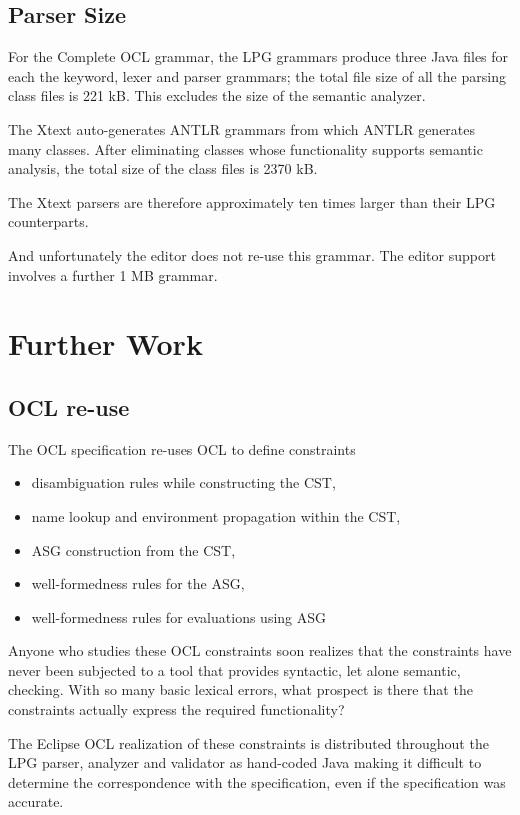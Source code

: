 \documentclass{eceasst}
\begin{document}
\subsection{Parser Size}

For the Complete OCL grammar, the LPG grammars produce three Java files for each the keyword, lexer and parser grammars; the total file size of all the parsing class files is 221 kB. This excludes the size of the semantic analyzer.

The Xtext auto-generates ANTLR grammars from which ANTLR generates many classes. After eliminating classes whose functionality supports semantic analysis, the total size of the class files is 2370 kB.

The Xtext parsers are therefore approximately ten times larger than their LPG counterparts.

And unfortunately the editor does not re-use this grammar. The editor support involves a further 1 MB grammar.

\section{Further Work}

\subsection{OCL re-use}

The OCL specification re-uses OCL to define constraints
\begin{itemize}
\item disambiguation rules while constructing the CST, 
\item name lookup and environment propagation within the CST, 
\item ASG construction from the CST, 
\item well-formedness rules for the ASG, 
\item well-formedness rules for evaluations using ASG
\end{itemize}

Anyone who studies these OCL constraints soon realizes that the constraints have never been subjected to a tool that provides syntactic, let alone semantic, checking. With so many basic lexical errors, what prospect is there that the constraints actually express the required functionality?

The Eclipse OCL realization of these constraints is distributed throughout the LPG parser, analyzer and validator as hand-coded Java making it difficult to determine the correspondence with the specification, even if the specification was accurate.
\end{document}
